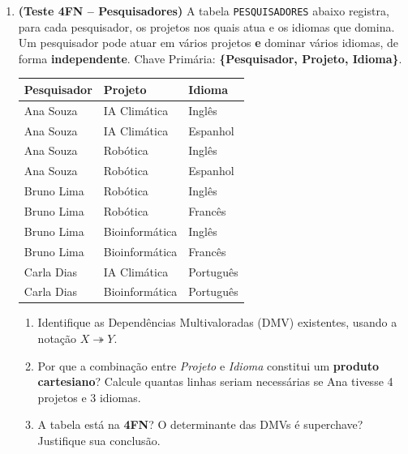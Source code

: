 \documentclass[12pt]{article}
\begin{document}
\begin{enumerate}[label=\textbf{Questão \arabic*:}, leftmargin=*]


  \item \textbf{(Teste 4FN -- Pesquisadores)} A tabela \texttt{PESQUISADORES} abaixo registra, para cada pesquisador, os projetos nos quais atua e os idiomas que domina. Um pesquisador pode atuar em vários projetos \textbf{e} dominar vários idiomas, de forma \textbf{independente}. Chave Primária: \textbf{\{Pesquisador, Projeto, Idioma\}}.

  \vspace{0.2cm}
  \centering
  \begin{tabular}{|l|l|l|}
    \hline
    \textbf{Pesquisador} & \textbf{Projeto} & \textbf{Idioma} \\ \hline
    Ana Souza  & IA Climática   & Inglês    \\ \hline
    Ana Souza  & IA Climática   & Espanhol  \\ \hline
    Ana Souza  & Robótica       & Inglês    \\ \hline
    Ana Souza  & Robótica       & Espanhol  \\ \hline
    Bruno Lima & Robótica       & Inglês    \\ \hline
    Bruno Lima & Robótica       & Francês   \\ \hline
    Bruno Lima & Bioinformática & Inglês    \\ \hline
    Bruno Lima & Bioinformática & Francês   \\ \hline
    Carla Dias & IA Climática   & Português \\ \hline
    Carla Dias & Bioinformática & Português \\ \hline
  \end{tabular}
  \flushleft
  \vspace{0.2cm}
  \begin{enumerate}[label=\alph*)]
    \item Identifique as Dependências Multivaloradas (DMV) existentes, usando a notação $X \twoheadrightarrow Y$.
    \item Por que a combinação entre \textit{Projeto} e \textit{Idioma} constitui um \textbf{produto cartesiano}? Calcule quantas linhas seriam necessárias se Ana tivesse 4 projetos e 3 idiomas.
    \item A tabela está na \textbf{4FN}? O determinante das DMVs é superchave? Justifique sua conclusão.
  \end{enumerate}


\end{enumerate}
\end{document}
